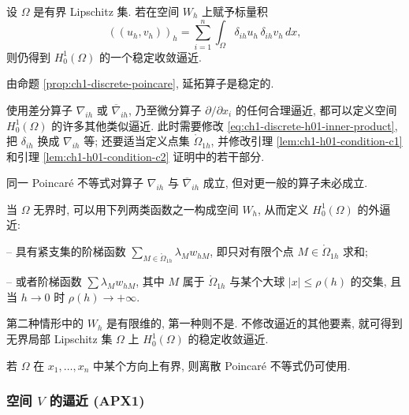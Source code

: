 \begin{Proposition}
\label{prop:ch1-h01-gradient-inner-product}
设 $\Omega$ 是有界 Lipschitz 集. 若在空间 $W_h$ 上赋予标量积
\begin{equation}
((u_h,v_h))_h
=\sum_{i=1}^n\int_\Omega\delta_{ih}u_h\,\delta_{ih}v_h\,dx,
\label{eq:ch1-discrete-gradient-inner-product}
\end{equation}
则仍得到 $H_0^1(\Omega)$ 的一个稳定收敛逼近.
\end{Proposition}

\begin{Proof}
由命题 \ref{prop:ch1-discrete-poincare}, 延拓算子是稳定的.
\end{Proof}

\begin{Remark}
\label{rem:ch1-alternative-difference-operators}
使用差分算子 $\nabla_{ih}$ 或 $\overline\nabla_{ih}$, 乃至微分算子 $\partial/\partial x_i$ 的任何合理逼近, 都可以定义空间 $H_0^1(\Omega)$ 的许多其他类似逼近. 此时需要修改 \eqref{eq:ch1-discrete-h01-inner-product}, 把 $\delta_{ih}$ 换成 $\nabla_{ih}$ 等; 还要适当定义点集 $\mathring\Omega_{1h}$, 并修改引理 \ref{lem:ch1-h01-condition-c1} 和引理 \ref{lem:ch1-h01-condition-c2} 证明中的若干部分.

同一 Poincaré 不等式对算子 $\nabla_{ih}$ 与 $\overline\nabla_{ih}$ 成立, 但对更一般的算子未必成立.
\end{Remark}

\begin{Remark}
\label{rem:ch1-unbounded-h01-approximation}
当 $\Omega$ 无界时, 可以用下列两类函数之一构成空间 $W_h$, 从而定义 $H_0^1(\Omega)$ 的外逼近:

-- 具有紧支集的阶梯函数 $\sum_{M\in\mathring\Omega_{1h}}\lambda_Mw_{hM}$, 即只对有限个点 $M\in\mathring\Omega_{1h}$ 求和;

-- 或者阶梯函数 $\sum\lambda_Mw_{hM}$, 其中 $M$ 属于 $\mathring\Omega_{1h}$ 与某个大球 $|x|\leq\rho(h)$ 的交集, 且当 $h\to0$ 时 $\rho(h)\to+\infty$.

第二种情形中的 $W_h$ 是有限维的, 第一种则不是. 不修改逼近的其他要素, 就可得到无界局部 Lipschitz 集 $\Omega$ 上 $H_0^1(\Omega)$ 的稳定收敛逼近.

若 $\Omega$ 在 $x_1,\ldots,x_n$ 中某个方向上有界, 则离散 Poincaré 不等式仍可使用.
\end{Remark}

\subsubsection{空间 \texorpdfstring{$V$}{V} 的逼近 (APX1)}
\label{subsubsec:ch1-space-v-apx1}


